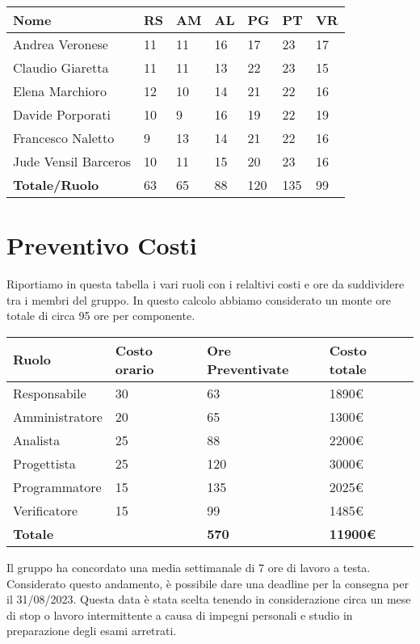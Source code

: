 \documentclass[12pt]{article}
\begin{document}
\begin{center}  
    \begin{tabular}{|l|l|l|l|l|l|l|}
        \hline
        \textbf{Nome} & \textbf{RS} & \textbf{AM} & \textbf{AL} & \textbf{PG} & \textbf{PT} & \textbf{VR}\\
        \hline
        Andrea Veronese & 11 & 11 & 16 & 17 & 23 & 17  \\
        \hline
        Claudio Giaretta & 11 & 11 & 13 & 22 & 23 & 15\\
        \hline
        Elena Marchioro & 12 & 10 & 14 & 21 & 22 & 16 \\
        \hline
        Davide Porporati & 10 & 9 & 16 & 19 & 22 & 19 \\
        \hline
        Francesco Naletto & 9 & 13 & 14 & 21 & 22 & 16 \\
        \hline
        Jude Vensil Barceros & 10 & 11 & 15 & 20 & 23 & 16 \\
        \hline
        \textbf{Totale/Ruolo} & 63 & 65 & 88 & 120 & 135 & 99 \\
        \hline
    \end{tabular}
\end{center}

\section{Preventivo Costi}
Riportiamo in questa tabella i vari ruoli con i relaltivi costi e ore da suddividere tra i membri del gruppo.
In questo calcolo abbiamo considerato un monte ore totale di circa 95 ore per componente.
\begin{center}  
    \begin{tabular}{|l|l|l|l|}
        \hline
        \textbf{Ruolo} & \textbf{Costo orario} & \textbf{Ore Preventivate} & \textbf{Costo totale}\\
        \hline
        Responsabile & 30 & 63 & 1890\euro  \\ 
        \hline
        Amministratore & 20 & 65 & 1300\euro \\
        \hline
        Analista & 25 & 88 & 2200\euro \\
        \hline
        Progettista & 25 & 120 & 3000\euro \\
        \hline
        Programmatore & 15 & 135 & 2025\euro \\
        \hline
        Verificatore & 15 & 99 & 1485\euro \\
        \hline
        \textbf{Totale} &  & \textbf{570} & \textbf{11900\euro} \\
        \hline
    \end{tabular}
\end{center}

Il gruppo ha concordato una media settimanale di 7 ore di lavoro a testa. Considerato questo andamento, è possibile dare una deadline per la consegna per il 31/08/2023. Questa data è stata scelta tenendo in considerazione circa un mese di stop o lavoro intermittente a causa di impegni personali e studio in preparazione degli esami arretrati.
\end{document}
